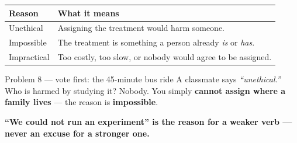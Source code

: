 \documentclass[aspectratio=169, 11pt]{beamer}
\newcommand{\redink}[1]{{\color{redacc}\bfseries #1}}
\begin{document}
\begin{frame}[t, plain]
  \vspace{2pt}
  \begin{center}
    \small
    \renewcommand{\arraystretch}{1.3}
    \begin{tabular}{@{} l l @{}}
    \hline
    \textbf{Reason} & \textbf{What it means} \\
    \hline
    Unethical   & Assigning the treatment would harm someone. \\
    Impossible  & The treatment is something a person already \emph{is} or \emph{has}. \\
    Impractical & Too costly, too slow, or nobody would agree to be assigned. \\
    \hline
    \end{tabular}
  \end{center}
  \vspace{6pt}
  \begin{block}{Problem 8 --- vote first: the 45-minute bus ride}
    A classmate says \emph{``unethical.''} Who is harmed by studying it? Nobody. You simply
    \redink{cannot assign where a family lives} --- the reason is \redink{impossible}.
  \end{block}
  \vspace{4pt}
  \begin{center}
    {\color{cerulean}\bfseries ``We could not run an experiment'' is the reason for a weaker
    verb --- never an excuse for a stronger one.}
  \end{center}
\end{frame}
\end{document}
